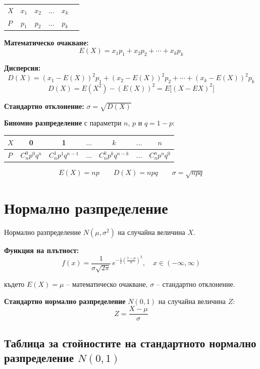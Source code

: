 \documentclass[12pt,a4paper]{article}
\begin{document}
\begin{center}
\begin{tabular}{l*{5}{c}}
\toprule
$X$ & $x_1$ & $x_2$ & $\ldots$ & $x_k$ \\
$P$ & $p_1$ & $p_2$ & $\ldots$ & $p_k$ \\
\bottomrule
\end{tabular}
\end{center}

\textbf{Математическо очакване:}
$$E(X)=x_1p_1+x_2p_2+\cdots+x_kp_k$$

\textbf{Дисперсия:}
$$D(X)=(x_1-E(X))^2p_1+(x_2-E(X))^2p_2+\cdots+(x_k-E(X))^2p_k$$
$$D(X)=E(X^2)-(E(X))^2=E\big[(X-EX)^2\big]$$

\textbf{Стандартно отклонение:} \quad $\sigma=\sqrt{D(X)}$

\textbf{Биномно разпределение} с параметри $n$, $p$ и $q=1-p$:

\begin{center}
\renewcommand{\arraystretch}{1.6}
\begin{tabular}{l*{6}{c}}
\toprule
$X$ & 0 & 1 & $\ldots$ & $k$ & $\ldots$ & $n$ \\
\midrule
$P$ & $C_n^0p^0q^n$ & $C_n^1p^1q^{n-1}$ & $\ldots$ & $C_n^kp^kq^{n-k}$ & $\ldots$ & $C_n^np^nq^0$ \\
\bottomrule
\end{tabular}
\end{center}

$$E(X)=np \qquad D(X)=npq \qquad \sigma=\sqrt{npq}$$

\section{Нормално разпределение}

Нормално разпределение $N(\mu,\sigma^2)$ на случайна величина $X$.

\textbf{Функция на плътност:}
$$f(x)=\frac{1}{\sigma\sqrt{2\pi}}\,e^{-\frac12\left(\frac{x-\mu}{\sigma}\right)^2},\quad x\in(-\infty,\infty)$$

където $E(X)=\mu$ -- математическо очакване, $\sigma$ -- стандартно отклонение.

\textbf{Стандартно нормално разпределение} $N(0,1)$ на случайна величина $Z$:
$$Z=\frac{X-\mu}{\sigma}$$

\subsection{Таблица за стойностите на стандартното нормално разпределение $N(0,1)$}
\end{document}
